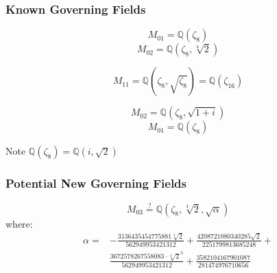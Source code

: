 \documentclass[12pt]{beamer}
\begin{document}
	\begin{frame}
		\frametitle{Known Governing Fields}
		$$M_{01} = \mathbb{Q}\left( \zeta_8 \right)$$
		$$M_{02} = \mathbb{Q}\left( \zeta_8, \sqrt[4]{2} \right)$$
		
		$$
		M_{11}
		= \mathbb{Q}\left( \zeta_8, \sqrt{\zeta_8} \right)
		= \mathbb{Q}\left( \zeta_{16} \right)
		$$
		
		$$M_{02} = \mathbb{Q}\left(\zeta_8, \sqrt{1+i} \right)$$
		$$M_{01} = \mathbb{Q}\left(\zeta_8\right)$$
		
		\vspace{0.5cm}
		
		\begin{flushright}
			Note $\mathbb{Q}\left( \zeta_8 \right) = \mathbb{Q}\left( i, \sqrt{2} \right)$
		\end{flushright}
	\end{frame}

	\begin{frame}
		\frametitle{Potential New Governing Fields}
		$$M_{03} \stackrel{?}{=} \mathbb{Q}\left(\zeta_8, \sqrt[4]{2}, \sqrt{\alpha}\right)$$
		where:
		\begin{align*}
			\alpha =
			&- \frac{3136435454775881 \sqrt[4]{2}}{562949953421312} + \frac{4208721080340285 \sqrt{2}}{2251799813685248} +\\
			&\frac{3672578267558083 \cdot \sqrt[4]{2}^3}{562949953421312} + \frac{3582104167901087}{281474976710656}
		\end{align*}
	\end{frame}
\end{document}
